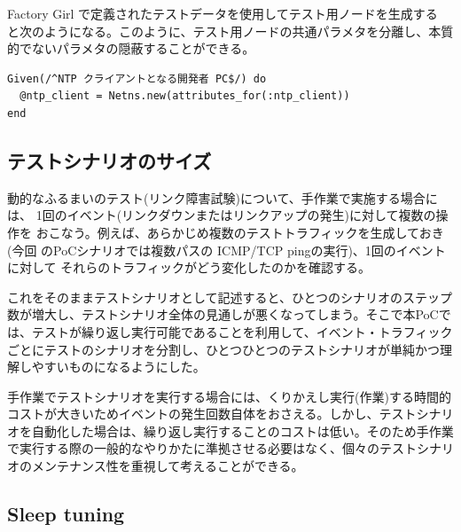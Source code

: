 Factory Girl で定義されたテストデータを使用してテスト用ノードを生成する
と次のようになる。このように、テスト用ノードの共通パラメタを分離し、本質
的でないパラメタの隠蔽することができる。
\begin{lstlisting}
Given(/^NTP クライアントとなる開発者 PC$/) do
  @ntp_client = Netns.new(attributes_for(:ntp_client))
end
\end{lstlisting}

  \subsection{テストシナリオのサイズ}


動的なふるまいのテスト(リンク障害試験)について、手作業で実施する場合には、
1回のイベント(リンクダウンまたはリンクアップの発生)に対して複数の操作を
おこなう。例えば、あらかじめ複数のテストトラフィックを生成しておき(今回
のPoCシナリオでは複数パスの ICMP/TCP pingの実行)、1回のイベントに対して
それらのトラフィックがどう変化したのかを確認する。

これをそのままテストシナリオとして記述すると、ひとつのシナリオのステップ
数が増大し、テストシナリオ全体の見通しが悪くなってしまう。そこで本PoCで
は、テストが繰り返し実行可能であることを利用して、イベント・トラフィック
ごとにテストのシナリオを分割し、ひとつひとつのテストシナリオが単純かつ理
解しやすいものになるようにした。

手作業でテストシナリオを実行する場合には、くりかえし実行(作業)する時間的
コストが大きいためイベントの発生回数自体をおさえる。しかし、テストシナリ
オを自動化した場合は、繰り返し実行することのコストは低い。そのため手作業
で実行する際の一般的なやりかたに準拠させる必要はなく、個々のテストシナリ
オのメンテナンス性を重視して考えることができる。

  \subsection{Sleep tuning}
  \label{sec:sleep-tuning}


